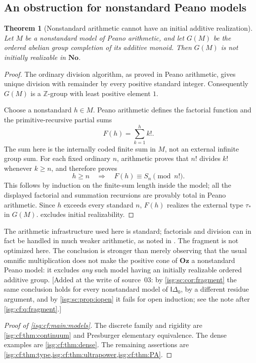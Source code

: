 \documentclass[11pt]{article}
\newtheorem{theorem}{Theorem}[section]
\theoremstyle{definition}
\theoremstyle{remark}
\newcommand{\No}{\ensuremath{\mathbf{No}}}
\newcommand{\Oz}{\ensuremath{\mathbf{Oz}}}
\newcommand{\Z}{\mathbb{Z}}
\newcommand{\Idelta}{\mathsf{I}\Delta_0}
\begin{document}
\subsection{An obstruction for nonstandard Peano models}\label{isg:cf:sec:PA}
\begin{theorem}[Nonstandard arithmetic cannot have an initial additive realization]
\label{isg:cf:thm:PA}
Let $M$ be a nonstandard model of Peano arithmetic, and let $G(M)$ be
the ordered abelian group completion of its additive monoid. Then
$G(M)$ is not initially realizable in $\No$.
\end{theorem}
\begin{proof}
The ordinary division algorithm, as proved in Peano arithmetic, gives
unique division with remainder by every positive standard integer.
Consequently $G(M)$ is a $\Z$-group with least positive element $1$.

Choose a nonstandard $h\in M$. Peano arithmetic defines the factorial
function and the primitive-recursive partial sums
\[
 F(h)=\sum_{k=1}^{h}k!.
\]
The sum here is the internally coded finite sum in $M$, not an external
infinite group sum. For each fixed ordinary $n$, arithmetic proves
that $n!$ divides $k!$ whenever $k\ge n$, and therefore proves
\[
 h\ge n\quad\Longrightarrow\quad F(h)\equiv S_n\pmod{n!}.
\]
This follows by induction on the finite-sum length inside the model;
all the displayed factorial and summation recursions are provably
total in Peano arithmetic. Since $h$ exceeds every standard $n$,
$F(h)$ realizes the external type $\tau_*$ in $G(M)$.
 excludes initial realizability.
\end{proof}

The arithmetic infrastructure used here is standard; factorials and
division can in fact be handled in much weaker arithmetic, as noted in
\cite{EnayatHamkinsWcislo}. The fragment is not optimized here. The
conclusion is stronger than merely observing that the usual
omnific multiplication does not make the positive cone of $\Oz$ a
nonstandard Peano model: it excludes \emph{any} such model having an
initially realizable ordered additive group.
\textup{[}Added at the write of source~03: by
\cref{isg:sc:cor:fragment} the same conclusion holds for every
nonstandard model of $\Idelta$, by a different residue argument, and by
\cref{isg:sc:prop:iopen} it fails for open induction; see the note after
\cref{isg:cf:q:fragment}.\textup{]}

\begin{proof}[Proof of \cref{isg:cf:main:models}]
The discrete family and rigidity are \cref{isg:cf:thm:continuum} and
Presburger elementary equivalence. The dense examples are
\cref{isg:cf:thm:dense}. The remaining assertions are
\cref{isg:cf:thm:type,isg:cf:thm:ultrapower,isg:cf:thm:PA}.
\end{proof}
\end{document}
